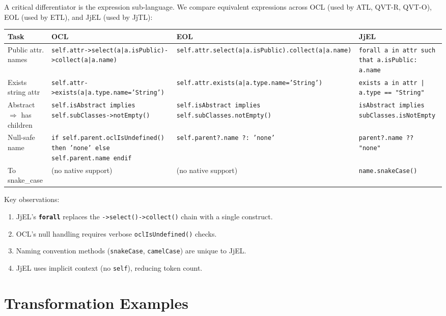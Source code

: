 \documentclass[11pt,a4paper]{article}
\newcommand{\jjel}{\textsf{JjEL}}
\newcommand{\jjtl}{\textsf{JjTL}}
\newcommand{\kw}[1]{\texttt{\textbf{#1}}}
\begin{document}
A critical differentiator is the expression sub-language. We compare equivalent expressions across OCL (used by ATL, QVT-R, QVT-O), EOL (used by ETL), and \jjel{} (used by \jjtl{}):

\begin{center}
\small
\begin{tabularx}{\textwidth}{@{}lXXX@{}}
\toprule
\textbf{Task} & \textbf{OCL} & \textbf{EOL} & \textbf{JjEL} \\
\midrule
Public attr. names &
\texttt{self.attr->select(a|a.isPublic)->collect(a|a.name)} &
\texttt{self.attr.select(a|a.isPublic).collect(a|a.name)} &
\texttt{forall a in attr such that a.isPublic: a.name} \\
\addlinespace
Exists string attr &
\texttt{self.attr->exists(a|a.type.name='String')} &
\texttt{self.attr.exists(a|a.type.name='String')} &
\texttt{exists a in attr | a.type == "String"} \\
\addlinespace
Abstract $\Rightarrow$ has children &
\texttt{self.isAbstract implies self.subClasses->notEmpty()} &
\texttt{self.isAbstract implies self.subClasses.notEmpty()} &
\texttt{isAbstract implies subClasses.isNotEmpty} \\
\addlinespace
Null-safe name &
\texttt{if self.parent.oclIsUndefined() then 'none' else self.parent.name endif} &
\texttt{self.parent?.name ?: 'none'} &
\texttt{parent?.name ?? "none"} \\
\addlinespace
To snake\_case &
(no native support) &
(no native support) &
\texttt{name.snakeCase()} \\
\bottomrule
\end{tabularx}
\end{center}

Key observations:
\begin{enumerate}
    \item \jjel{}'s \kw{forall} replaces the \texttt{->select()->collect()} chain with a single construct.
    \item OCL's null handling requires verbose \texttt{oclIsUndefined()} checks.
    \item Naming convention methods (\texttt{snakeCase}, \texttt{camelCase}) are unique to \jjel{}.
    \item \jjel{} uses implicit context (no \texttt{self}), reducing token count.
\end{enumerate}


\section{Transformation Examples}\label{sec:examples}
\end{document}
